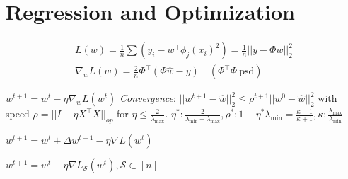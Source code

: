 \section{Regression and Optimization}

\begin{definition}
  \begin{gather*}
    L(w) = \frac{1}{n}\sum(y_i - w^\top \phi_j(x_i)^2) = \frac{1}{n}||y - \Phi w||_2^2 \\
    \nabla_w L(w) = \frac{2}{n}\Phi^\top (\Phi \hat{w} - y) \quad (\Phi^\top \Phi \ \text{psd})
  \end{gather*}
\end{definition}

\begin{definition}
  \(w^{t+1} = w^t - \eta\nabla_wL(w^t)\)
  \textit{Convergence}: \(||w^{t+1} - \hat{w}||_2^2 \leq \rho^{t+1} ||w^0 - \hat{w}||_2^2\) with speed \(\rho = ||I - \eta X^\top X||_{op}\) for \(\eta \leq \frac{2}{\lambda_{\max}}\). \(\eta^* : \frac{2}{\lambda_{\min} + \lambda_{\max}}, \rho^* : 1 - \eta^* \lambda_{\min} =\frac{\kappa - 1}{\kappa + 1}, \kappa : \frac{\lambda_{\max}}{\lambda_{\min}}\)
\end{definition}

\begin{definition}[Momentum]
  \(w^{t+1} = w^t + \Delta w^{t-1} - \eta \nabla L(w^t)\)
\end{definition}

\begin{definition}[SGD]
  \(w^{t+1} = w^t - \eta \nabla L_{\mathcal{S}}(w^t), \mathcal{S} \subset [n]\)
\end{definition}
